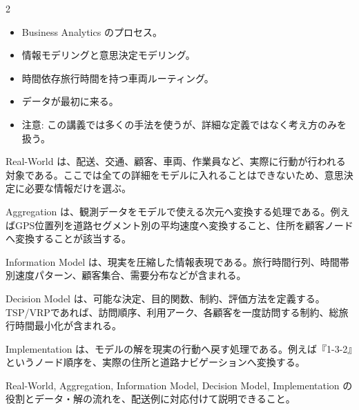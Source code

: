 \begin{multicols}{2}

\footnotesize

\raggedcolumns


\begin{itemize}
\item Business Analytics のプロセス。
\item 情報モデリングと意思決定モデリング。
\item 時間依存旅行時間を持つ車両ルーティング。
\item データが最初に来る。
\item 注意: この講義では多くの手法を使うが、詳細な定義ではなく考え方のみを扱う。
\end{itemize}

Real-World は、配送、交通、顧客、車両、作業員など、実際に行動が行われる対象である。ここでは全ての詳細をモデルに入れることはできないため、意思決定に必要な情報だけを選ぶ。\par

Aggregation は、観測データをモデルで使える次元へ変換する処理である。例えばGPS位置列を道路セグメント別の平均速度へ変換すること、住所を顧客ノードへ変換することが該当する。\par

Information Model は、現実を圧縮した情報表現である。旅行時間行列、時間帯別速度パターン、顧客集合、需要分布などが含まれる。\par

Decision Model は、可能な決定、目的関数、制約、評価方法を定義する。TSP/VRPであれば、訪問順序、利用アーク、各顧客を一度訪問する制約、総旅行時間最小化が含まれる。\par

Implementation は、モデルの解を現実の行動へ戻す処理である。例えば『1-3-2』というノード順序を、実際の住所と道路ナビゲーションへ変換する。\par

Real-World, Aggregation, Information Model, Decision Model, Implementation の役割とデータ・解の流れを、配送例に対応付けて説明できること。\par


\end{multicols}

